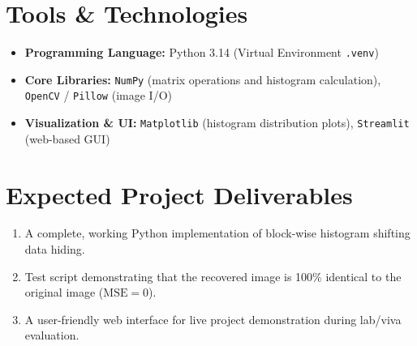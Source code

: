 \documentclass[10pt,a4paper]{article}
\begin{document}
\section{Tools \& Technologies}
\begin{itemize}[leftmargin=1.2em, itemsep=1pt, topsep=1pt, parsep=0pt]
    \footnotesize
    \item \textbf{Programming Language:} Python 3.14 (Virtual Environment \texttt{.venv})
    \item \textbf{Core Libraries:} \texttt{NumPy} (matrix operations and histogram calculation), \texttt{OpenCV} / \texttt{Pillow} (image I/O)
    \item \textbf{Visualization \& UI:} \texttt{Matplotlib} (histogram distribution plots), \texttt{Streamlit} (web-based GUI)
\end{itemize}

\section{Expected Project Deliverables}
\begin{enumerate}[leftmargin=1.4em, itemsep=1pt, topsep=1pt, parsep=0pt]
    \item A complete, working Python implementation of block-wise histogram shifting data hiding.
    \item Test script demonstrating that the recovered image is 100\% identical to the original image ($\text{MSE} = 0$).
    \item A user-friendly web interface for live project demonstration during lab/viva evaluation.
\end{enumerate}
\end{document}
